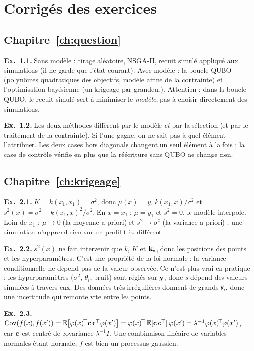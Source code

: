 \chapter{Corrigés des exercices}\label{annexe:corriges}

\section*{Chapitre~\ref{ch:question} }
\textbf{Ex.~1.1.} Sans modèle : tirage aléatoire, NSGA-II, recuit simulé appliqué aux simulations (il ne garde que l'état courant). Avec modèle : la boucle QUBO (polynômes quadratiques des objectifs, modèle affine de la contrainte) et l'optimisation bayésienne (un krigeage par grandeur). Attention : dans la boucle QUBO, le recuit simulé sert à minimiser le \emph{modèle}, pas à choisir directement des simulations.

\textbf{Ex.~1.2.} Les deux méthodes diffèrent par le modèle \emph{et} par la sélection (et par le traitement de la contrainte). Si l'une gagne, on ne sait pas à quel élément l'attribuer. Les deux cases hors diagonale changent un seul élément à la fois ; la case de contrôle vérifie en plus que la réécriture sans QUBO ne change rien.

\section*{Chapitre~\ref{ch:krigeage} }
\textbf{Ex.~2.1.} $K=k(x_1,x_1)=\sigma^2$, donc $\mu(x)=y_1\,k(x_1,x)/\sigma^2$ et $s^2(x)=\sigma^2-k(x_1,x)^2/\sigma^2$. En $x=x_1$ : $\mu=y_1$ et $s^2=0$, le modèle interpole. Loin de $x_1$ : $\mu\to0$ (la moyenne a priori) et $s^2\to\sigma^2$ (la variance a priori) : une simulation n'apprend rien sur un profil très différent.

\textbf{Ex.~2.2.} $s^2(x)$ ne fait intervenir que $k$, $K$ et $\mathbf{k}_\star$, donc les positions des points et les hyperparamètres. C'est une propriété de la loi normale : la variance conditionnelle ne dépend pas de la valeur observée. Ce n'est plus vrai en pratique : les hyperparamètres ($\sigma^2$, $\theta_i$, bruit) sont réglés sur $\mathbf{y}$, donc $s$ dépend des valeurs simulées à travers eux. Des données très irrégulières donnent de grands $\theta_i$, donc une incertitude qui remonte vite entre les points.

\textbf{Ex.~2.3.} $\mathrm{Cov}(f(x),f(x'))=\mathbb E\big[\varphi(x)^{\!\top}\mathbf{c}\,\mathbf{c}^{\top}\varphi(x')\big]=\varphi(x)^{\!\top}\,\mathbb E[\mathbf{c}\,\mathbf{c}^{\top}]\,\varphi(x')=\lambda^{-1}\varphi(x)^{\!\top}\varphi(x')$, car $\mathbf{c}$ est centré de covariance $\lambda^{-1}I$. Une combinaison linéaire de variables normales étant normale, $f$ est bien un processus gaussien.

